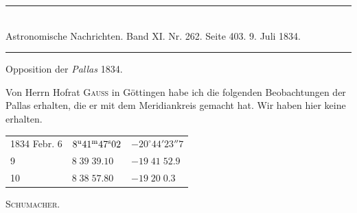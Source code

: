 \clearpage
\hypertarget{native-468-pallas}{}
\begin{center}
\rule{0.55\linewidth}{0.4pt}\\[2pt]
Astronomische Nachrichten. Band XI. Nr. 262. Seite 403. 9. Juli 1834.\\[2pt]
\rule{0.55\linewidth}{0.4pt}
\end{center}

\begin{center}Opposition der \emph{Pallas} 1834.\end{center}

Von Herrn Hofrat \textsc{Gauss} in Göttingen habe ich die folgenden Beobachtungen der Pallas erhalten, die er mit dem Meridiankreis gemacht hat. Wir haben hier keine erhalten.

\begin{center}
\begin{tabular}{l|l|l}
1834 Febr. 6 & $8^{\rm u}41^{\rm m}47^{\rm s}02$ & $-20^\circ44'23''7$ \\
\hfill 9 & $8\;39\;39.10$ & $-19\;41\;52.9$ \\
\hfill 10 & $8\;38\;57.80$ & $-19\;20\;0.3$ \\
\end{tabular}
\end{center}
\begin{flushright}\textsc{Schumacher.}\end{flushright}

